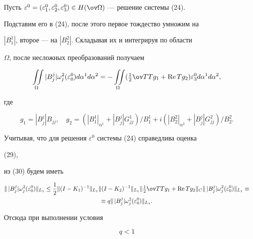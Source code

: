  


Пусть $\varepsilon^0=(\varepsilon^0_1,\varepsilon^0_2, 


\varepsilon^0_3)\in H(\ov\Omega)$ --- решение системы (24). 


Подставим его в (24), после этого первое тождество умножим на 


$|B^1_1|$, второе --- на $|B^2_2|$. Складывая их и интегрируя по области 


$\Omega$, после несложных преобразований получаем 


\begin{equation} 


\iint\limits_\Omega|B^j_j|\omega^2_j(\varepsilon^0_0)d\alpha^1d\alpha^2 


=-\iint\limits_\Omega(\tfrac{1}{2}\ov T T g_1+\re T g_2) 


\varepsilon^0_3d\alpha^1d\alpha^2, 


\end{equation} 


где 


$$ 


g_1=|B^j_j|B_{jj},\quad g_2=(|B^1_1|_{\alpha^1}+ 


|B^j_j|G^1_{jj})/B^1_1+i(|B^2_2|_{\alpha^2}+ 


|B^j_j|G^2_{jj})/B^2_2. 


$$ 


Учитывая, что для решения $\varepsilon^0$ системы (24) справедлива оценка 


(29), 


из (30) будем иметь 


\begin{multline*} 


\|\,|B^j_j|\omega^2_j(\varepsilon^0_0)\|_{L_1}\le \frac{1}{2} 


\|(I-K_1)^{-1}\|_{L_1}\|(I-K_2)^{-1}\|_{L_1} 


\|\tfrac{1}{2}\ov T T g_1+\re T g_2\|_C 


\|\,|B^j_j|\omega^2_j(\varepsilon^0_0)\|_{L_1}\equiv \\ 


% 


\equiv q\|\,|B^j_j|\omega^2_j(\varepsilon^0_0)\|_{L_1}. 


\end{multline*} 


Отсюда при выполнении условия 


\begin{equation} 


q<1 


\end{equation} 


